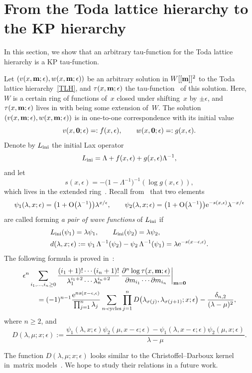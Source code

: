 \documentclass[11pt]{article}
\numberwithin{equation}{section}
\newcommand{\e}{\epsilon}
\newcommand{\p}{\partial}
\newcommand{\nn}{\nonumber}
\newcommand{\beq}{\begin{equation}}
\newcommand{\eeq}{\end{equation}}
\numberwithin{equation}{section}
\begin{document}
\section{From the Toda lattice hierarchy to the KP hierarchy}\label{sectionToda}
In this section, we show that an arbitrary tau-function for the Toda lattice hierarchy is a KP tau-function.

Let $(v(x,{\bf m};\e), w(x,{\bf m};\e))$ be an arbitrary solution in $W[[{\bf m}]]^2$
to the Toda lattice hierarchy~\eqref{TLH}, and $\tau(x,{\bf m};\e)$ the tau-function~\cite{CDZ, DY, DZ-toda} of this solution.
Here, $W$ is a certain ring of functions of~$x$ closed under shifting~$x$
by $\pm \e$, and $\tau(x,{\bf m};\e)$ lives in  with  being some extension of~$W$.
The solution $(v(x,{\bf m};\e), w(x,{\bf m};\e))$ is in one-to-one correspondence
with its initial value
\[
v(x,{\bf 0};\e)=:f(x,\e), \qquad w(x,{\bf 0}; \e)=:g(x,\e).
\]
Denote by $L_{\rm ini}$ the initial Lax operator
\[
L_{\rm ini}=\Lambda+f(x,\e) + g(x,\e)\Lambda^{-1},
\]
and let
\[
s(x,\e) = - \bigl(1-\Lambda^{-1}\bigr)^{-1} (\log g(x,\e)),
\]
which lives in the extended ring~.
Recall from~\cite{Y} that two elements
\[
 \psi_1(\lambda,x;\e) = \bigl(1+{\rm O}\bigl(\lambda^{-1}\bigr)\bigr)\lambda^{x/\e}, \qquad
\psi_2(\lambda,x;\e)=\bigl(1+{\rm O}\bigl(\lambda^{-1}\bigr)\bigr){\rm e}^{-s(x,\e)}\lambda^{-x/\e}
\]
are called forming {\it a pair of wave functions} of $L_{\rm ini}$ if
\begin{align*}%
& L_{\rm ini} (\psi_1) = \lambda \psi_1, \qquad L_{\rm ini} (\psi_2) = \lambda \psi_2,\\
& d(\lambda,x;\e):= \psi_1 \, \Lambda^{-1}(\psi_2) - \psi_2 \, \Lambda^{-1}(\psi_1) = \lambda {\rm e}^{-s(x-\e,\e)}.
\end{align*}
The following formula is proved in~\cite{Y}:
\begin{align}
& \e^n \sum_{i_1,\dots,i_n\ge0}
\frac{(i_1+1)! \cdots (i_n+1)!} {\lambda_1^{i_1+2}\cdots \lambda_n^{i_n+2}} \,
\frac{\p^n \log \tau(x,{\bf m};\e)}{\p m_{i_1} \cdots \p m_{i_n}}\bigg|_{{\bf m}={\bf 0}}\nn\\
&\qquad{}= (-1)^{n-1} \frac{{\rm e}^{n s(x-\e,\e)}}{\prod_{j=1}^n \lambda_j} \sum_{\text{$n$-cycles}}
\prod_{j=1}^n D\bigl(\lambda_{\sigma(j)},\lambda_{\sigma(j+1)}; x;\e\bigr) - \frac{\delta_{n,2}}{(\lambda-\mu)^2},\label{Y421}
\end{align}
where $n\ge2$, and
\beq\label{dpsiabtoda}
D(\lambda,\mu; x;\e) := \frac{\psi_1(\lambda,x;\e) \psi_2(\mu,x-\e;\e) - \psi_1(\lambda,x-\e;\e) \psi_2(\mu,x;\e)}{\lambda-\mu}.
\eeq
\begin{Remark}
The function $D(\lambda,\mu; x;\e)$ looks similar to the
Christoffel--Darboux kernel in~matrix models~\cite{Deift, Mehta}.
We hope to study their relations in a future work.
\end{Remark}
\end{document}
